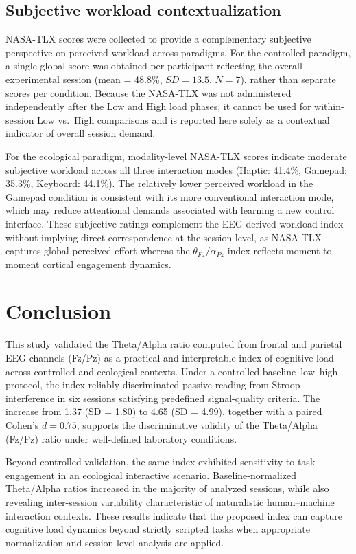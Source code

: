 \documentclass[10pt]{iopart}
\begin{document}
\subsection*{Subjective workload contextualization}
\label{sec:discussion_nasa}

NASA-TLX scores were collected to provide a complementary
subjective perspective on perceived workload across paradigms.
For the controlled paradigm, a single global score was obtained
per participant reflecting the overall experimental session
(mean = 48.8\%, $SD = 13.5$, $N = 7$), rather than separate
scores per condition. Because the NASA-TLX was not administered
independently after the Low and High load phases, it cannot be
used for within-session Low vs.\ High comparisons and is reported
here solely as a contextual indicator of overall session demand.

For the ecological paradigm, modality-level NASA-TLX scores
indicate moderate subjective workload across all three
interaction modes (Haptic: 41.4\%, Gamepad: 35.3\%, Keyboard:
44.1\%). The relatively lower perceived workload in the Gamepad
condition is consistent with its more conventional interaction
mode, which may reduce attentional demands associated with
learning a new control interface. These subjective ratings
complement the EEG-derived workload index without implying
direct correspondence at the session level, as NASA-TLX
captures global perceived effort whereas the
$\theta_{Fz}/\alpha_{Pz}$ index reflects moment-to-moment
cortical engagement dynamics.

\section{Conclusion}

This study validated the Theta/Alpha ratio computed from frontal and parietal EEG channels (Fz/Pz) as a practical and interpretable index of cognitive load across controlled and ecological contexts. Under a controlled baseline--low--high protocol, the index reliably discriminated passive reading from Stroop interference in six sessions satisfying predefined signal-quality criteria. The increase from 1.37 (SD = 1.80) to 4.65 (SD = 4.99), together with a paired Cohen's $d = 0.75$, supports the discriminative validity of the Theta/Alpha (Fz/Pz) ratio under well-defined laboratory conditions.

Beyond controlled validation, the same index exhibited sensitivity to task engagement in an ecological interactive scenario. Baseline-normalized Theta/Alpha ratios increased in the majority of analyzed sessions, while also revealing inter-session variability characteristic of naturalistic human--machine interaction contexts. These results indicate that the proposed index can capture cognitive load dynamics beyond strictly scripted tasks when appropriate normalization and session-level analysis are applied.
\end{document}
